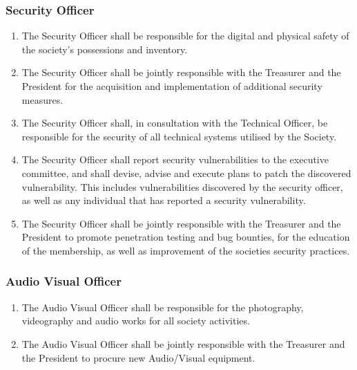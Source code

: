 \documentclass[parskip=half]{scrartcl}
\begin{document}
            \subsubsection{Security Officer}
                \label{executive--executive-positions--security-officer}
                \begin{enumerate}
                    \item The Security Officer shall be responsible for the digital and physical safety of the society's possessions and inventory.
                    
                    \item The Security Officer shall be jointly responsible with the Treasurer and the President for the acquisition and implementation of additional security measures.
                    
                    \item The Security Officer shall, in consultation with the Technical Officer, be responsible for the security of all technical systems utilised by the Society.
                    
                    \item The Security Officer shall report security vulnerabilities to the executive committee, and shall devise, advise and execute plans to patch the discovered vulnerability. This includes vulnerabilities discovered by the security officer, as well as any individual that has reported a security vulnerability.
                    
                    \item The Security Officer shall be jointly responsible with the Treasurer and the President to promote penetration testing and bug bounties, for the education of the membership, as well as improvement of the societies security practices.
                \end{enumerate}
            
            \subsubsection{Audio Visual Officer}
                \label{executive--executive-positions--audiovisual-officer}
                \begin{enumerate}
                    \item The Audio Visual Officer shall be responsible for the photography, videography and audio works for all society activities.

                    \item The Audio Visual Officer shall be jointly responsible with the Treasurer and the President to procure new Audio/Visual equipment.
                \end{enumerate}
            
\end{document}
